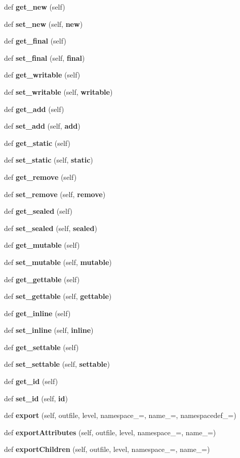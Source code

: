\begin{DoxyCompactItemize}
def {\bf get\+\_\+new} (self)
\item 
def {\bf set\+\_\+new} (self, {\bf new})
\item 
def {\bf get\+\_\+final} (self)
\item 
def {\bf set\+\_\+final} (self, {\bf final})
\item 
def {\bf get\+\_\+writable} (self)
\item 
def {\bf set\+\_\+writable} (self, {\bf writable})
\item 
def {\bf get\+\_\+add} (self)
\item 
def {\bf set\+\_\+add} (self, {\bf add})
\item 
def {\bf get\+\_\+static} (self)
\item 
def {\bf set\+\_\+static} (self, {\bf static})
\item 
def {\bf get\+\_\+remove} (self)
\item 
def {\bf set\+\_\+remove} (self, {\bf remove})
\item 
def {\bf get\+\_\+sealed} (self)
\item 
def {\bf set\+\_\+sealed} (self, {\bf sealed})
\item 
def {\bf get\+\_\+mutable} (self)
\item 
def {\bf set\+\_\+mutable} (self, {\bf mutable})
\item 
def {\bf get\+\_\+gettable} (self)
\item 
def {\bf set\+\_\+gettable} (self, {\bf gettable})
\item 
def {\bf get\+\_\+inline} (self)
\item 
def {\bf set\+\_\+inline} (self, {\bf inline})
\item 
def {\bf get\+\_\+settable} (self)
\item 
def {\bf set\+\_\+settable} (self, {\bf settable})
\item 
def {\bf get\+\_\+id} (self)
\item 
def {\bf set\+\_\+id} (self, {\bf id})
\item 
def {\bf export} (self, outfile, level, namespace\+\_\+=\textquotesingle{}\textquotesingle{}, name\+\_\+=\textquotesingle{}, namespacedef\+\_\+=\textquotesingle{}\textquotesingle{})
\item 
def {\bf export\+Attributes} (self, outfile, level, namespace\+\_\+=\textquotesingle{}\textquotesingle{}, name\+\_\+=\textquotesingle{})
\item 
def {\bf export\+Children} (self, outfile, level, namespace\+\_\+=\textquotesingle{}\textquotesingle{}, name\+\_\+=\textquotesingle{})

\end{DoxyCompactItemize}
